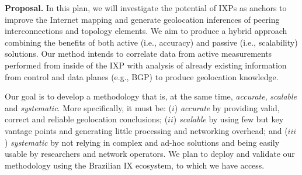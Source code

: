 	\textbf{Proposal.} In this plan, we will investigate the potential of IXPs as anchors to improve the Internet mapping and generate geolocation inferences of peering interconnections and topology elements. We aim to produce a hybrid approach combining the benefits of both active (i.e., accuracy) and passive (i.e., scalability) solutions. Our method intends to correlate data from active measurements performed from inside of the IXP with analysis of already existing information from control and data planes (e.g., BGP) to produce geolocation knowledge. 

	Our goal is to develop a methodology that is, at the same time, \emph{accurate}, \emph{scalable} and \emph{systematic}. More specifically, it must be: ($i$) \emph{accurate} by providing valid, correct and reliable geolocation conclusions; ($ii$) \emph{scalable} by using few but key vantage points and generating little processing and networking overhead; and ($iii$) \emph{systematic} by not relying in complex and ad-hoc solutions and being easily usable by researchers and network operators. We plan to deploy and validate our methodology using the Brazilian IX ecosystem, to which we have access.



